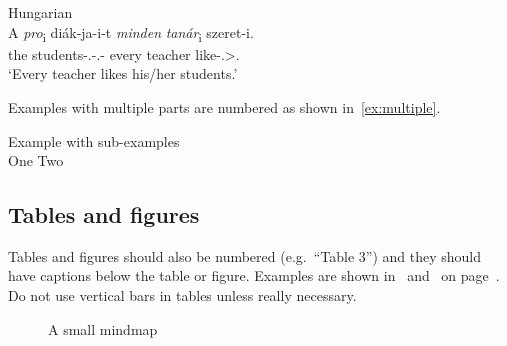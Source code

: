 \ea\label{ex:hungarian}Hungarian \parencite[adapted from][469]{EKiss2008}\\
    \gll    A \emph{pro}\textsubscript{i} diák-ja-i-t \emph{minden} \emph{tanár}\textsubscript{i} szeret-i.\\
            the {} students-\Poss.\Tsg-\Poss.\Pl-\Acc{} every teacher like-\Tsg.\Sbj>\Third.\Obj{}\\
    \glt    `Every teacher likes his/her students.'\\
\z

Examples with multiple parts are numbered as shown in~\eqref{ex:multiple}.

\ea\label{ex:multiple}Example with sub-examples\\
    \ea One
    \ex Two
    \z
\z

\subsection{Tables and figures}

Tables and figures should also be numbered (e.g.\ \enquote{Table 3}) and they
should have captions below the table or figure. Examples are shown
in~ and~ on page~\pageref{fig:figure}. Do not
use vertical bars in tables unless really necessary.

\begin{figure}
\caption{A small mindmap}\label{fig:figure}
\end{figure}

